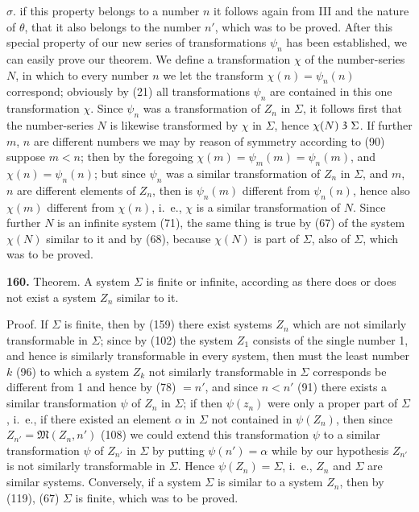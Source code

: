 \documentclass[oneside]{book}
\newcommand\partof{\mathrel{\raisebox{0.45ex}{$\mathfrak{3}$}}}   %
\newcommand\mypara{\medskip\textbf}
\begin{document}
$\sigma$. if this property belongs to a number $n$ it follows
again from III and the nature of $\theta$, that it also belongs
to the number $n'$, which was to be proved. After this
special property of our new series of transformations
$\psi_n$ has been established, we can easily prove our theorem.
We define a transformation $\chi$ of the number-series
$N$, in which to every number $n$ we let the transform
$\chi(n)=\psi_n(n)$ correspond; obviously by (21) all
transformations $\psi_n$ are contained in this one transformation
$\chi$. Since $\psi_n$ was a transformation of $Z_n$ in
$\Sigma$, it follows first that the number-series $N$ is likewise
transformed by $\chi$ in $\Sigma$, hence $\chi(N) \partof \Sigma$. If further $m$,
$n$ are different numbers we may by reason of symmetry
according to (90) suppose $m<n$; then by the
foregoing $\chi(m)=\psi_m(m)=\psi_n(m)$, and $\chi(n)=\psi_n(n)$;
but since $\psi_n$ was a similar transformation of $Z_n$ in $\Sigma$,
and $m$, $n$ are different elements of $Z_n$, then is $\psi_n(m)$
different from $\psi_n(n)$, hence also $\chi(m)$ different from
$\chi(n)$, i.~e., $\chi$ is a similar transformation of $N$. Since
further $N$ is an infinite system (71), the same thing
is true by (67) of the system $\chi(N)$ similar to it and
by (68), because $\chi(N)$ is part of $\Sigma$, also of $\Sigma$, which
was to be proved.

\mypara{160.} Theorem. A system $\Sigma$ is finite or infinite,
according as there does or does not exist a system
$Z_n$ similar to it.

Proof. If $\Sigma$ is finite, then by (159) there exist
systems $Z_n$ which are not similarly transformable in
$\Sigma$; since by (102) the system $Z_1$ consists of the single
number 1, and hence is similarly transformable in
every system, then must the least number $k$ (96) to
which a system $Z_k$ not similarly transformable in $\Sigma$ corresponds
be different from 1 and hence by (78) $=n'$,
and since $n<n'$ (91) there exists a similar transformation
$\psi$ of $Z_n$ in $\Sigma$; if then $\psi(z_n)$ were only a proper part
of $\Sigma$, i.~e., if there existed an element $\alpha$ in $\Sigma$ not contained
in $\psi(Z_n)$, then since $Z_{n'}=\mathfrak{M}(Z_n, n')$ (108)
we could extend this transformation $\psi$ to a similar
transformation $\psi$ of $Z_{n'}$ in $\Sigma$ by putting $\psi(n')=\alpha$ while
by our hypothesis $Z_{n'}$ is not similarly transformable
in $\Sigma$. Hence $\psi(Z_n) = \Sigma$, i.~e., $Z_n$ and $\Sigma$ are similar
systems. Conversely, if a system $\Sigma$ is similar to a
system $Z_n$, then by (119), (67) $\Sigma$ is finite, which was
to be proved.
\end{document}
